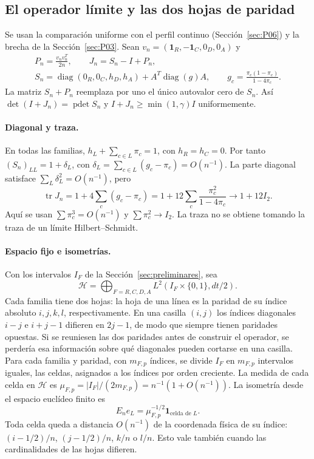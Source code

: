 \subsection{El operador límite y las dos hojas de paridad}\label{sec:D03}
Se usan la comparación uniforme con el perfil continuo (Sección~\ref{sec:P06}) y la brecha de la
Sección~\ref{sec:P03}.
Sean $v_n=(\mathbf1_R,-\mathbf1_C,0_D,0_A)$ y
\[
 \begin{gathered}
 P_n=\frac{v_nv_n^T}{2n},\qquad J_n=S_n-I+P_n,\\
 S_n=\operatorname{diag}(0_R,0_C,h_D,h_A)+A^T\operatorname{diag}(g)A,
 \qquad g_c=\frac{\pi_c(1-\pi_c)}{1-4\pi_c}.
 \end{gathered}                                         \tag{D3.1}
\]
La matriz $S_n+P_n$ reemplaza por uno el único autovalor cero de $S_n$.
Así $\det(I+J_n)=\operatorname{pdet}S_n$ y
$I+J_n\ge\min(1,\gamma)I$ uniformemente.

\paragraph{Diagonal y traza.}
En todas las familias, $h_L+\sum_{c\in L}\pi_c=1$, con $h_R=h_C=0$.
Por tanto $(S_n)_{LL}=1+\delta_L$, con
$\delta_L=\sum_{c\in L}(g_c-\pi_c)=O(n^{-1})$.
La parte diagonal satisface $\sum_L\delta_L^2=O(n^{-1})$, pero
\[
 \operatorname{tr}J_n
 =1+4\sum_c(g_c-\pi_c)
 =1+12\sum_c\frac{\pi_c^2}{1-4\pi_c}
 \longrightarrow1+12I_2.                          \tag{D3.2}
\]
Aquí se usan $\sum\pi_c^3=O(n^{-1})$ y $\sum\pi_c^2\to I_2$.
La traza no se obtiene tomando la traza de un límite Hilbert--Schmidt.

\paragraph{Espacio fijo e isometrías.}
Con los intervalos $I_F$ de la Sección~\ref{sec:preliminares}, sea
\[
 \mathcal H=\bigoplus_{F=R,C,D,A}
          L^2(I_F\times\{0,1\},dt/2).
\]
Cada familia tiene dos hojas: la hoja de una línea es la paridad de su índice absoluto
$i,j,k,l$, respectivamente. En una casilla $(i,j)$ los índices diagonales $i-j$ e $i+j-1$
difieren en $2j-1$, de modo que siempre tienen paridades opuestas. Si se reuniesen las dos
paridades antes de construir el operador, se perdería esa información sobre qué diagonales
pueden cortarse en una casilla.
Para cada familia y paridad, con $m_{F,p}$ índices, se divide $I_F$
en $m_{F,p}$ intervalos iguales, las celdas, asignados a los índices por orden creciente.
La medida de cada celda en $\mathcal H$ es
$\mu_{F,p}=|I_F|/(2m_{F,p})=n^{-1}(1+O(n^{-1}))$.
La isometría desde el espacio euclídeo finito es
\[
 E_ne_L=\mu_{F,p}^{-1/2}\mathbf1_{\text{celda de }L}.
                                                        \tag{D3.3}
\]
Toda celda queda a distancia $O(n^{-1})$ de la coordenada física
de su índice: $(i-1/2)/n$, $(j-1/2)/n$, $k/n$ o $l/n$.
Esto vale también cuando las cardinalidades de las hojas difieren.

